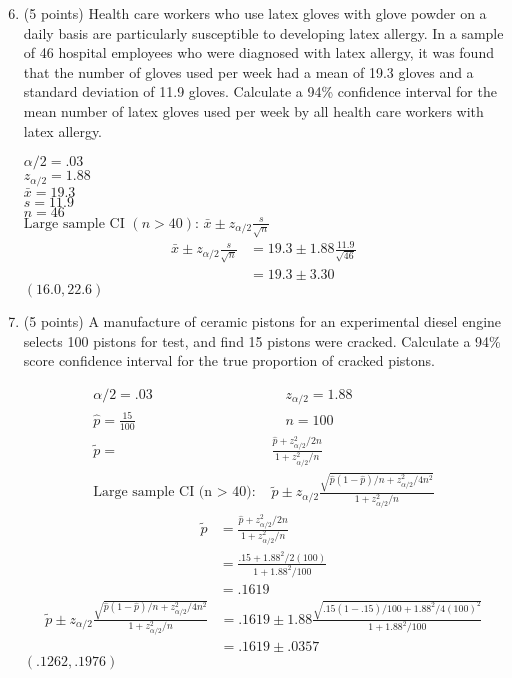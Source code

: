 \documentclass[12pt, letter]{article}
\newenvironment{nscenter}
	{\parskip=0pt\par\nopagebreak\centering}
	{\par\noindent\ignorespacesafterend}
\begin{document}
\begin{enumerate}
	\setcounter{enumi}{5}
	\item (5 points) Health care workers who use latex gloves with glove powder on a daily basis are particularly susceptible to developing latex allergy. In a sample of 46 hospital employees who were diagnosed with latex allergy, it was found that the number of gloves used per week had a mean of 19.3 gloves and a standard deviation of 11.9 gloves. Calculate a 94\% confidence interval for the mean number of latex gloves used per week by all health care workers with latex allergy.
	\begin{nscenter}
		$\alpha/2 = .03$ \\
		$z_{\alpha/2} = 1.88$ \\
		$\bar{x} = 19.3$ \\
		$s = 11.9$ \\
		$n = 46$ \\
		$\text{Large sample CI $(n > 40)$: } \bar{x} \pm z_{\alpha/2}\frac{s}{\sqrt{n}}$
		\begin{align*}
			\bar{x} \pm z_{\alpha/2}\frac{s}{\sqrt{n}} &= 19.3 \pm 1.88\frac{11.9}{\sqrt{46}} \\
			&= 19.3 \pm 3.30
		\end{align*}
		$\boxed{(16.0, 22.6)}$
	\end{nscenter}
	
	\item (5 points) A manufacture of ceramic pistons for an experimental diesel engine selects 100 pistons for test, and find 15 pistons were cracked. Calculate a 94\% score confidence interval for the true proportion of cracked pistons.
	\begin{center}
		\begingroup
		\addtolength{\jot}{1em}
		\begin{align*}
			\alpha/2 = .03 \quad & \quad z_{\alpha/2} = 1.88 \\
			\hat{p} = \frac{15}{100} \quad & \quad n = 100 \\
			\tilde{p} = &\frac{\hat{p} + z^{2}_{\alpha/2}/2n}{1 + z^{2}_{\alpha/2}/n} \\
			\text{Large sample CI (n $>$ 40): }& \tilde{p} \pm z_{\alpha/2}\frac{\sqrt{\hat{p}(1 - \hat{p})/n + z^{2}_{\alpha/2}/4n^{2}}}{1 + z^{2}_{\alpha/2}/n}
		\end{align*}
		\endgroup
		\begin{align*}
			\tilde{p} &= \frac{\hat{p} + z^{2}_{\alpha/2}/2n}{1 + z^{2}_{\alpha/2}/n} \\
			&= \frac{.15 + 1.88^{2}/2(100)}{1 + 1.88^{2}/100} \\
			&= .1619
		\end{align*}
		\begin{align*}
			\tilde{p} \pm z_{\alpha/2}\frac{\sqrt{\hat{p}(1 - \hat{p})/n + z^{2}_{\alpha/2}/4n^{2}}}{1 + z^{2}_{\alpha/2}/n} &= .1619 \pm 1.88\frac{\sqrt{.15(1 - .15)/100 + 1.88^{2}/4(100)^{2}}}{1 + 1.88^{2}/100} \\
			&= .1619 \pm .0357
		\end{align*}
		$\boxed{(.1262, .1976)}$
	\end{center}
	

\end{enumerate}
\end{document}
